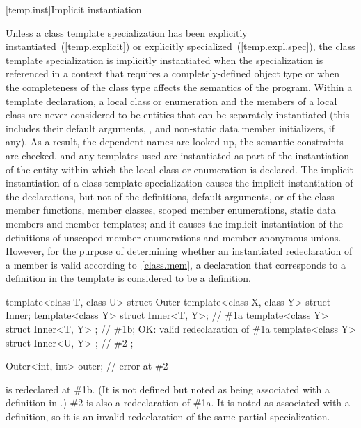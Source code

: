 [temp.inst]{Implicit instantiation}

\pnum
{}%
Unless a class template specialization has been explicitly
instantiated~(\ref{temp.explicit}) or explicitly
specialized~(\ref{temp.expl.spec}),
the class template specialization is implicitly instantiated when the
specialization is referenced in a context that requires a completely-defined
object type or when the completeness of the class type affects the semantics
of the program.
\enternote
Within a template declaration, a local class or enumeration and the members of
a local class are never considered to be entities that can be separately
instantiated (this includes their default arguments,
, and non-static data member
initializers, if any). As a result, the dependent names are looked up, the
semantic constraints are checked, and any templates used are instantiated as
part of the instantiation of the entity within which the local class or
enumeration is declared.
\exitnote
The implicit instantiation of a class template specialization causes
the implicit instantiation of the declarations, but not of the definitions,
default arguments, or  of the class member functions,
member classes, scoped member enumerations, static data members and member templates; and it causes the
implicit instantiation of the definitions of unscoped member enumerations and member anonymous unions.
However, for the purpose of determining whether an instantiated redeclaration
of a member is valid according to~\ref{class.mem}, a declaration that
corresponds to a definition in the template is considered to be a
definition.
\enterexample
\begin{codeblock}
template<class T, class U>
struct Outer {
  template<class X, class Y> struct Inner;
  template<class Y> struct Inner<T, Y>;         // \#1a
  template<class Y> struct Inner<T, Y> { };     // \#1b; OK: valid redeclaration of \#1a
  template<class Y> struct Inner<U, Y> { };     // \#2
};

Outer<int, int> outer;                          // error at \#2
\end{codeblock}

 is redeclared at \#1b. (It is not defined
but noted as being associated with a definition in .) \#2
is also a redeclaration of \#1a. It is noted as associated with a definition,
so it is an invalid redeclaration of the same partial specialization.
\exitexample

